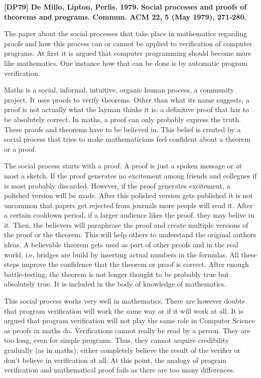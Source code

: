 \documentclass[a4paper,12pt,english]{scrartcl}
\begin{document}
\pagestyle{fancy} %

\noindent
\textbf{\textsf{{\large [DP79] De Millo, Lipton, Perlis. 1979. Social processes and proofs of theorems and programs. Commun. ACM 22, 5 (May 1979), 271-280.}}}
\vspace{2mm}

The paper about the social processes that take place in mathematics regarding
proofs and how this process can or cannot be applied to verification of computer
programs. At first it is argued that computer programming should become more
like mathematics. One instance how that can be done is by automatic program
verification.

Maths is a social, informal, intuitive, organic human process, a community
project. It uses proofs to verify theorems. Other than what its name suggests,
a proof is not actually what the layman thinks it is: a definitive proof that
has to be absolutely correct. In maths, a proof can only probably express the
truth. These proofs and theorems have to be believed in. This belief is created
by a social process that tries to make mathematicians feel confident about a
theorem	or a proof.

The social process starts with a proof. A proof is just a spoken message or at
most a sketch. If the proof generates no excitement among friends and collegues
if is most probably discarded. However, if the proof generates excitement, a
polished version will be made. After this polished version gets
published \textemdash{} it is not uncommon that papers get rejected from
journals \textemdash{} more people will read it. After a certain cooldown
period, if a larger audience likes the proof, they may belive in it. Then,
the believers will paraphrase the proof and create multiple versions of the
proof or the theorem. This will help others to understand the original authors
ideas. A believable theorem gets used as part of other proofs and in the real
world, i.e. bridges are build by inserting actual numbers in the formulas. All
these steps improve the confidence that the theorem or proof is correct. After
enough battle-testing, the theorem is not longer thought to be probably true but
absolutely true. It is included in the body of knowledge of mathematics.

This social process works very well in mathematics. There are however doubts
that program verification will work the same way or if it will work at all. It
is argued that program verification will not play the same role in Computer
Science as proofs in maths do. Verifications cannot really be read by a person.
They are too long, even for simple programs. Thus, they cannot acquire
credibility gradually (as in maths); either completely believe the result of the
verifier or don't believe in verification at all. At this point, the analogy of
program verification and mathematical proof fails as there are too many
differences.
\end{document}

